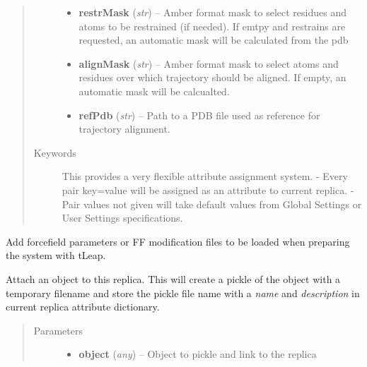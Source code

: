 \documentclass[letterpaper,10pt,english]{sphinxmanual}
\begin{document}
\begin{fulllineitems}
\begin{fulllineitems}
\begin{quote}
\begin{description}
\begin{itemize}
\item {} 
\textbf{restrMask} (\emph{str}) -- Amber format mask to select residues and atoms to be restrained (if needed). If emtpy and restrains are requested, an automatic mask will be calculated from the pdb

\item {} 
\textbf{alignMask} (\emph{str}) -- Amber format mask to select atoms and residues over which trajectory should be aligned. If empty, an automatic mask will be calcualted.

\item {} 
\textbf{refPdb} (\emph{str}) -- Path to a PDB file used as reference for trajectory alignment.

\end{itemize}

\item[{Keywords}] \leavevmode
This provides a very flexible attribute assignment system.
- Every pair key=value will be assigned as an attribute to current replica.
- Pair values not given will take default values from Global Settings or User Settings specifications.

\end{description}\end{quote}

\end{fulllineitems}


\begin{fulllineitems}
\label{replicas:pyMDMix.Replicas.Replica.addFF}
Add forcefield parameters or FF modification files to be loaded when preparing the system with tLeap.

\end{fulllineitems}


\begin{fulllineitems}
\label{replicas:pyMDMix.Replicas.Replica.attach}
Attach an object to this replica. This will create a pickle of the object
with a temporary filename and store the pickle file name with a \emph{name} and \emph{description}
in current replica attribute  dictionary.
\begin{quote}\begin{description}
\item[{Parameters}] \leavevmode\begin{itemize}
\item {} 
\textbf{object} (\emph{any}) -- Object to pickle and link to the replica


\end{itemize}
\end{description}
\end{quote}
\end{fulllineitems}
\end{fulllineitems}
\end{document}
